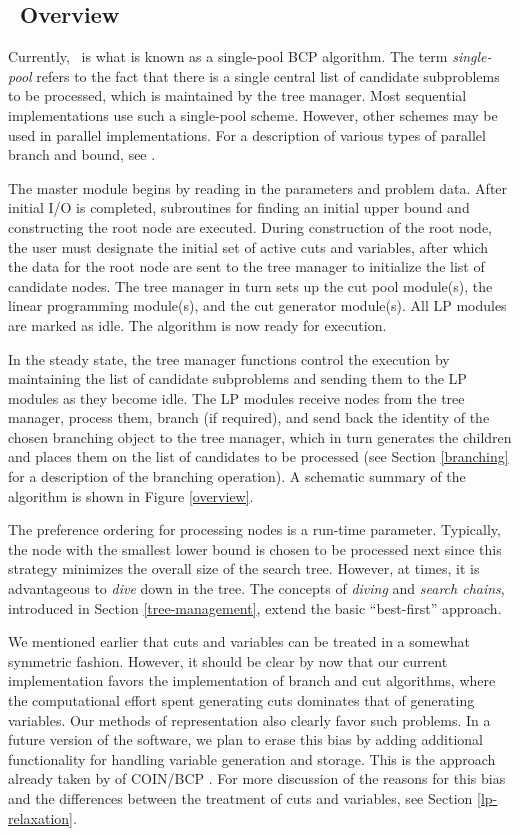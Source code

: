 \subsection{\BB\ Overview}
\label{symphony}

Currently, \BB\ is what is known as a single-pool BCP algorithm.
The term {\em single-pool} refers to the fact that there is a single
central list of candidate subproblems to be processed, which is
maintained by the tree manager. Most sequential implementations use
such a single-pool scheme. However, other schemes may be used in
parallel implementations. For a description of various types of
parallel branch and bound, see \cite{G&C}.

The master module begins by reading in the parameters and problem
data. After initial I/O is completed, subroutines for finding an
initial upper bound and constructing the root node are executed.
During construction of the root node, the user must designate the
initial set of active cuts and variables, after which the data for the
root node are sent to the tree manager to initialize the list of
candidate nodes. The tree manager in turn sets up the cut pool
module(s), the linear programming module(s), and the cut generator
module(s). All LP modules are marked as idle. The algorithm is now
ready for execution.

In the steady state, the tree manager functions control the execution by
maintaining the list of candidate subproblems and sending them to the
LP modules as they become idle. The LP modules receive nodes from
the tree manager, process them, branch (if required), and send back
the identity of the chosen branching object to the tree manager, which
in turn generates the children and places them on the list of
candidates to be processed (see Section \ref{branching} for a description 
of the branching operation). A schematic summary of the algorithm is
shown in Figure \ref{overview}.

The preference ordering for processing nodes is a run-time parameter.
Typically, the node with the smallest lower bound is chosen to be
processed next since this strategy minimizes the overall size of the
search tree. However, at times, it is advantageous to {\em dive}
down in the tree. The concepts of {\em diving} and {\em search
chains}, introduced in Section \ref{tree-management}, extend the basic
``best-first'' approach.

We mentioned earlier that cuts and variables can be treated in a
somewhat symmetric fashion. However, it should be clear by now
that our current implementation favors the implementation of
branch and cut algorithms, where the computational effort spent
generating cuts dominates that of generating variables. Our methods of
representation also clearly favor such problems. In a future version
of the software, we plan to erase this bias by adding additional
functionality for handling variable generation and storage. This is
the approach already taken by of COIN/BCP \cite{coin-or}. For more
discussion of the reasons for this bias and the differences between
the treatment of cuts and variables, see Section \ref{lp-relaxation}.

